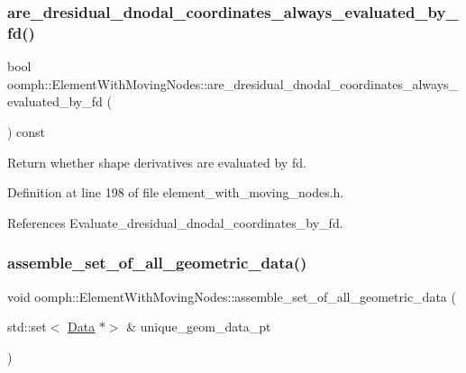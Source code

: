 \subsubsection{\texorpdfstring{are\+\_\+dresidual\+\_\+dnodal\+\_\+coordinates\+\_\+always\+\_\+evaluated\+\_\+by\+\_\+fd()}{are\_dresidual\_dnodal\_coordinates\_always\_evaluated\_by\_fd()}}
{\footnotesize\ttfamily bool oomph\+::\+Element\+With\+Moving\+Nodes\+::are\+\_\+dresidual\+\_\+dnodal\+\_\+coordinates\+\_\+always\+\_\+evaluated\+\_\+by\+\_\+fd (\begin{DoxyParamCaption}{ }\end{DoxyParamCaption}) const\hspace{0.3cm}{\ttfamily [inline]}}



Return whether shape derivatives are evaluated by fd. 



Definition at line 198 of file element\+\_\+with\+\_\+moving\+\_\+nodes.\+h.



References Evaluate\+\_\+dresidual\+\_\+dnodal\+\_\+coordinates\+\_\+by\+\_\+fd.

\mbox{\label{classoomph_1_1ElementWithMovingNodes_a9f483615124c0a4ce4be88c5c19190f5}} 
\subsubsection{\texorpdfstring{assemble\+\_\+set\+\_\+of\+\_\+all\+\_\+geometric\+\_\+data()}{assemble\_set\_of\_all\_geometric\_data()}}
{\footnotesize\ttfamily void oomph\+::\+Element\+With\+Moving\+Nodes\+::assemble\+\_\+set\+\_\+of\+\_\+all\+\_\+geometric\+\_\+data (\begin{DoxyParamCaption}\item[{std\+::set$<$ \hyperlink{classoomph_1_1Data}{Data} $\ast$$>$ \&}]{unique\+\_\+geom\+\_\+data\+\_\+pt }\end{DoxyParamCaption})}



